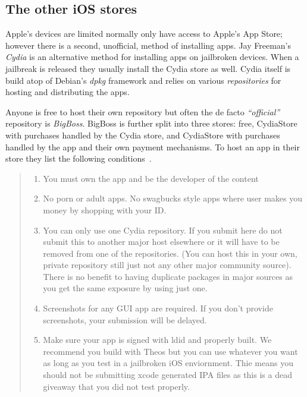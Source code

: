 \documentclass[thesis.tex]{subfiles}
\begin{document}

\subsection{The other iOS stores}

Apple's devices are limited normally only have access to Apple's App Store; however there is a second, unofficial, method of installing apps.
Jay Freeman's \emph{Cydia} is an alternative method for installing apps on jailbroken devices.
When a jailbreak is released they usually install the Cydia store as well.
Cydia itself is build atop of Debian's \emph{dpkg} framework and relies on various \emph{repositories} for hosting and distributing the apps.

Anyone is free to host their own repository but often the de facto \emph{``official''} repository is \emph{BigBoss}.
BigBoss is further split into three stores: free, CydiaStore with purchases handled by the Cydia store, and CydiaStore with purchases handled by the app and their own payment mechanisms.  To host an app in their store they list the following conditions~\cite{bigboss_host_2014}.

\begin{quotation}
  \begin{enumerate}
    \item You must own the app and be the developer of the content

    \item No porn or adult apps. No swagbucks style apps where user makes you money by shopping with your ID.

    \item You can only use one Cydia repository. If you submit here do not submit this to another major host elsewhere or it will have to be removed from one of the repositories. (You can host this in your own, private repository still just not any other major community source). There is no benefit to having duplicate packages in major sources as you get the same exposure by using just one.

    \item Screenshots for any GUI app are required. If you don’t provide screenshots, your submission will be delayed.

    \item Make sure your app is signed with ldid and properly built. We recommend you build with Theos but you can use whatever you want as long as you test in a jailbroken iOS enviornment. Thie means you should not be submitting xcode generated IPA files as this is a dead giveaway that you did not test properly.
  \end{enumerate}
\end{quotation}
\end{document}
